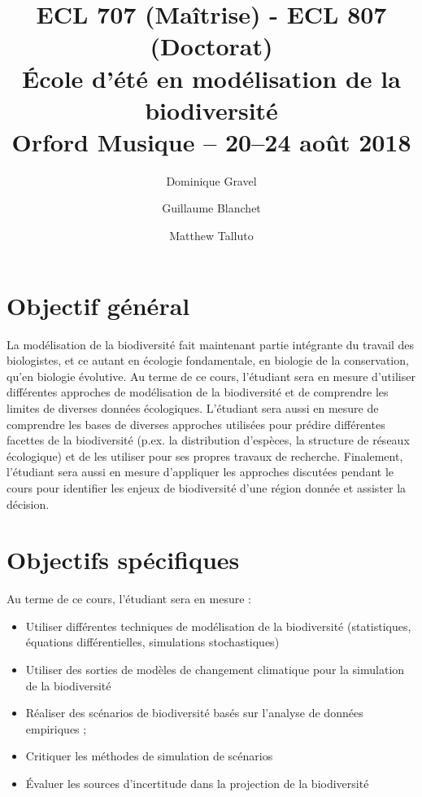 \documentclass[12]{article}
\title{ECL 707 (Maîtrise) - ECL 807 (Doctorat) \\ École d'été en modélisation de la biodiversité\\Orford Musique -- 20--24 août 2018}
\date {}
\author[1]{Dominique Gravel}
\author[1]{Guillaume Blanchet}
\author[2]{Matthew Talluto}
\affil[1]{Départment de biologie, Université de Sherbrooke}
\affil[2]{Leibniz-Institute of freshwater ecology and inland fisheries}
\begin{document}
	\maketitle

	\section*{Objectif général}

  La modélisation de la biodiversité fait maintenant partie intégrante du
  travail des biologistes, et ce autant en écologie fondamentale, en biologie de
  la conservation, qu'en biologie évolutive. Au terme de ce cours, l'étudiant
  sera en mesure d'utiliser différentes approches de modélisation de la
  biodiversité et de comprendre les limites de diverses données écologiques.
  L'étudiant sera aussi en mesure de comprendre les bases de diverses approches
  utilisées pour prédire différentes facettes de la biodiversité (p.ex. la
  distribution d'espèces, la structure de réseaux écologique) et de les utiliser
  pour ses propres travaux de recherche. Finalement, l'étudiant sera aussi en
  mesure d'appliquer les approches discutées pendant le cours pour identifier
  les enjeux de biodiversité d'une région donnée et assister la décision.

	\section*{Objectifs spécifiques}

	Au terme de ce cours, l'étudiant sera en mesure :

	\begin{itemize}
	\renewcommand{\labelitemi}{$\bullet$}

  \item  Utiliser différentes techniques de modélisation de la biodiversité (statistiques, équations différentielles, simulations stochastiques)

  \item Utiliser des sorties de modèles de changement climatique pour la simulation de la biodiversité

  \item Réaliser des scénarios de biodiversité basés sur l'analyse de données empiriques ;

  \item Critiquer les méthodes de simulation de scénarios

  \item Évaluer les sources d'incertitude dans la projection de la biodiversité

	\end{itemize}
\end{document}
